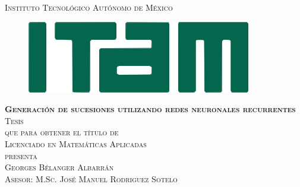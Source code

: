 \begin{titlepage}
\begin{center}

\textsc{\Large Instituto Tecnológico Autónomo de México}\\[4em]

\begin{figure}[h]
\begin{center}
\includegraphics{./imag/itam.png}
\end{center}
\end{figure}

\vspace{4em}

\textsc{\huge \textbf{Generación de sucesiones utilizando redes neuronales recurrentes}}\\[4em]

\textsc{\large Tesis}\\[1em]

\textsc{que para obtener el título de}\\[1em]

\textsc{Licenciado en Matemáticas Aplicadas}\\[1em]

\textsc{presenta}\\[1em]

\textsc{\Large Georges Bélanger Albarrán}\\[1em]

\textsc{\large Asesor: M.Sc. José Manuel Rodriguez Sotelo}

\end{center}
\end{titlepage}

